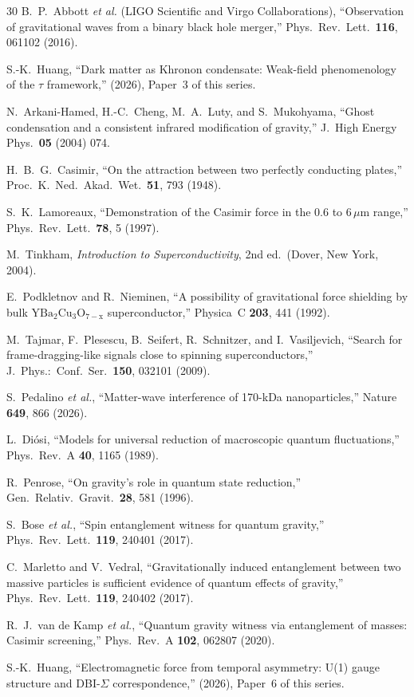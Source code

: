 \documentclass[prd,twocolumn,superscriptaddress,longbibliography,floatfix]{revtex4-2}
\begin{document}
\begin{thebibliography}{30}
B.~P.~Abbott \textit{et al.} (LIGO Scientific and Virgo Collaborations),
``Observation of gravitational waves from a binary black hole merger,''
Phys.\ Rev.\ Lett.\ \textbf{116}, 061102 (2016).

S.-K.~Huang,
``Dark matter as Khronon condensate: Weak-field phenomenology of the
$\tau$ framework,''
(2026), Paper~3 of this series.

N.~Arkani-Hamed, H.-C.~Cheng, M.~A.~Luty, and S.~Mukohyama,
``Ghost condensation and a consistent infrared modification of
gravity,''
J.\ High Energy Phys.\ \textbf{05} (2004) 074.

H.~B.~G.~Casimir,
``On the attraction between two perfectly conducting plates,''
Proc.\ K.\ Ned.\ Akad.\ Wet.\ \textbf{51}, 793 (1948).

S.~K.~Lamoreaux,
``Demonstration of the Casimir force in the 0.6 to $6\,\mu$m range,''
Phys.\ Rev.\ Lett.\ \textbf{78}, 5 (1997).

M.~Tinkham,
\textit{Introduction to Superconductivity}, 2nd ed.\
(Dover, New York, 2004).

E.~Podkletnov and R.~Nieminen,
``A possibility of gravitational force shielding by bulk
$\mathrm{YBa_2Cu_3O_{7-x}}$ superconductor,''
Physica~C \textbf{203}, 441 (1992).

M.~Tajmar, F.~Plesescu, B.~Seifert, R.~Schnitzer, and I.~Vasiljevich,
``Search for frame-dragging-like signals close to spinning
superconductors,''
J.\ Phys.:\ Conf.\ Ser.\ \textbf{150}, 032101 (2009).

S.~Pedalino \textit{et al.},
``Matter-wave interference of 170-kDa nanoparticles,''
Nature \textbf{649}, 866 (2026).

L.~Di\'osi,
``Models for universal reduction of macroscopic quantum
fluctuations,''
Phys.\ Rev.\ A \textbf{40}, 1165 (1989).

R.~Penrose,
``On gravity's role in quantum state reduction,''
Gen.\ Relativ.\ Gravit.\ \textbf{28}, 581 (1996).

S.~Bose \textit{et al.},
``Spin entanglement witness for quantum gravity,''
Phys.\ Rev.\ Lett.\ \textbf{119}, 240401 (2017).

C.~Marletto and V.~Vedral,
``Gravitationally induced entanglement between two massive particles
is sufficient evidence of quantum effects of gravity,''
Phys.\ Rev.\ Lett.\ \textbf{119}, 240402 (2017).

R.~J.~van de Kamp \textit{et al.},
``Quantum gravity witness via entanglement of masses: Casimir
screening,''
Phys.\ Rev.\ A \textbf{102}, 062807 (2020).

S.-K.~Huang,
``Electromagnetic force from temporal asymmetry: U(1) gauge structure
and DBI-$\Sigma$ correspondence,''
(2026), Paper~6 of this series.

\end{thebibliography}
\end{document}

